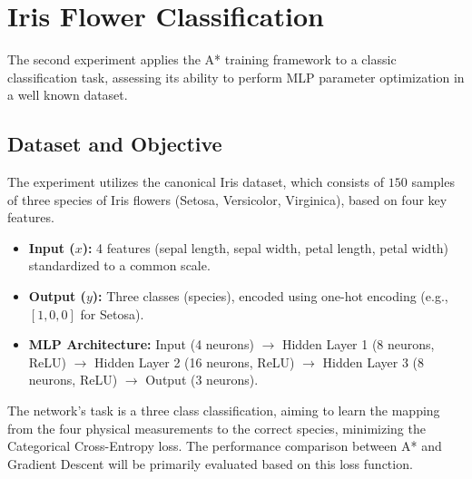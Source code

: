 

\section{Iris Flower Classification}
\label{sec:iris_classification}

\noindent The second experiment applies the A* training framework to a classic classification task, assessing its ability to perform MLP parameter optimization in a well known dataset.

\subsection{Dataset and Objective}

The experiment utilizes the canonical Iris dataset, which consists of $150$ samples of three species of Iris flowers (Setosa, Versicolor, Virginica), based on four key features.

\begin{itemize}
    \item \textbf{Input ($x$):} 4 features (sepal length, sepal width, petal length, petal width) standardized to a common scale.
    \item \textbf{Output ($y$):} Three classes (species), encoded using one-hot encoding (e.g., $[1, 0, 0]$ for Setosa).
\item \textbf{MLP Architecture:} Input (4 neurons) $\rightarrow$ 
      Hidden Layer 1 (8 neurons, ReLU) $\rightarrow$ 
      Hidden Layer 2 (16 neurons, ReLU) $\rightarrow$ 
      Hidden Layer 3 (8 neurons, ReLU) $\rightarrow$ 
      Output (3 neurons).\end{itemize}

\noindent The network's task is a three class classification, aiming to learn the mapping from the four physical measurements to the correct species, minimizing the Categorical Cross-Entropy loss. The performance comparison between A* and Gradient Descent will be primarily evaluated based on this loss function.

